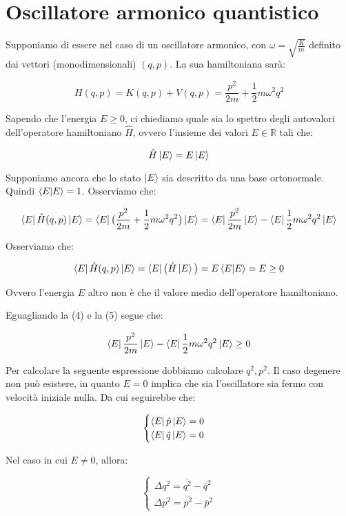 \documentclass[]{article}
\begin{document}
\section{Oscillatore armonico quantistico}
Supponiamo di essere nel caso di un oscillatore armonico, con $\omega = \sqrt{\frac{K}{m}}$ definito dai vettori (monodimensionali) $(q, p)$. La sua hamiltoniana sarà:

\begin{equation}
	H(q, p) = K(q, p) + V(q, p) = \frac{p^2}{2m} + \frac{1}{2}m\omega^2q^2
\end{equation}

Sapendo che l'energia $E \geq 0$, ci chiediamo quale sia lo spettro degli autovalori dell'operatore hamiltoniano $\hat{H}$, ovvero l'insieme dei valori $E \in \mathbb{R}$ tali che:

\begin{equation}
	\hat{H} \ket{E} = E \ket{E}
\end{equation}

Supponiamo ancora che lo stato $\ket{E}$ sia descritto da una base ortonormale.
Quindi $\bra{E}\ket{E} = 1$. Osserviamo che:

\begin{equation}
	\bra{E}\hat{H}(q, p)\ket{E} = \bra{E}\big(\frac{p^2}{2m} + \frac{1}{2}m\omega^2q^2\big)\ket{E} = \bra{E}\frac{p^2}{2m}\ket{E} - \bra{E}\frac{1}{2}m\omega^2q^2\ket{E}
\end{equation}

Osserviamo che:

\begin{equation}
	\bra{E}\hat{H}(q, p)\ket{E} = \bra{E} \big(\hat{H} \ket{E} \big) = E \bra{E}\ket{E} = E \geq 0
\end{equation}

Ovvero l'energia $E$ altro non è che il valore medio dell'operatore hamiltoniano.

\newpage
Eguagliando la (4) e la (5) segue che:

\begin{equation}
	\bra{E}\frac{p^2}{2m}\ket{E} - \bra{E}\frac{1}{2}m\omega^2q^2\ket{E} \geq 0
\end{equation}

Per calcolare la seguente espressione dobbiamo calcolare $q^2, p^2$. Il caso degenere non può esistere, in quanto $E = 0$ implica che sia l'oscillatore sia fermo con velocità iniziale nulla. Da cui seguirebbe che:

\begin{equation}
	\begin{cases}
	\bra{E}\hat{p}\ket{E} = 0\\
	\bra{E}\hat{q}\ket{E} = 0
	\end{cases}
\end{equation}

Nel caso in cui $E \neq 0$, allora:

\begin{equation}
\begin{cases}
\Delta q^2 = \overline{q^2} - \overline{q}^2 \\
\Delta p^2 = \overline{p^2} - \overline{p}^2
\end{cases}
\end{equation}
\end{document}
